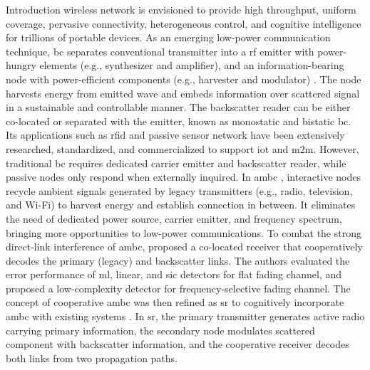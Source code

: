 \documentclass[journal]{IEEEtran}
\begin{document}
\glsresetall

\begin{section}{Introduction}
	 wireless network is envisioned to provide high throughput, uniform coverage, pervasive connectivity, heterogeneous control, and cognitive intelligence for trillions of portable devices.
	As an emerging low-power communication technique, \gls{bc} separates conventional transmitter into a \gls{rf} emitter with power-hungry elements (e.g., synthesizer and amplifier), and an information-bearing node with power-efficient components (e.g., harvester and modulator) \cite{Boyer2014}.
	The node harvests energy from emitted wave and embeds information over scattered signal in a sustainable and controllable manner.
	The backscatter reader can be either co-located or separated with the emitter, known as monostatic and bistatic \gls{bc}.
	Its applications such as \gls{rfid} \cite{Dobkin2012,Landt2005} and passive sensor network \cite{Vannucci2008,Assimonis2016} have been extensively researched, standardized, and commercialized to support \gls{iot} and \gls{m2m}.
	However, traditional \gls{bc} requires dedicated carrier emitter and backscatter reader, while passive nodes only respond when externally inquired.
	In \gls{ambc} \cite{Liu2013b}, interactive nodes recycle ambient signals generated by legacy transmitters (e.g., radio, television, and Wi-Fi) to harvest energy and establish connection in between.
	It eliminates the need of dedicated power source, carrier emitter, and frequency spectrum, bringing more opportunities to low-power communications.
	To combat the strong direct-link interference of \gls{ambc}, \cite{Yang2018} proposed a co-located receiver that cooperatively decodes the primary (legacy) and backscatter links.
	The authors evaluated the error performance of \gls{ml}, linear, and \gls{sic} detectors for flat fading channel, and proposed a low-complexity detector for frequency-selective fading channel.
	The concept of cooperative \gls{ambc} was then refined as \gls{sr} to cognitively incorporate \gls{ambc} with existing systems \cite{Liang2020}.
	In \gls{sr}, the primary transmitter generates active radio carrying primary information, the secondary node modulates scattered component with backscatter information, and the cooperative receiver decodes both links from two propagation paths.

\end{section}
\end{document}

